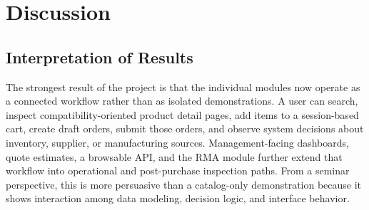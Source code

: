 \documentclass[12pt,letterpaper,oneside,openany]{book}
\begin{document}
\chapter{Discussion}

\section{Interpretation of Results}

\begin{justifying}
The strongest result of the project is that the individual modules now operate
as a connected workflow rather than as isolated demonstrations. A user can
search, inspect compatibility-oriented product detail pages, add items to a
session-based cart, create draft orders, submit those orders, and observe
system decisions about inventory, supplier, or manufacturing sources.
Management-facing dashboards, quote estimates, a browsable API, and the RMA
module further extend that workflow into operational and post-purchase
inspection paths. From a seminar perspective, this is more persuasive than a
catalog-only demonstration because it shows interaction among data modeling,
decision logic, and interface behavior.
\end{justifying}
\end{document}
